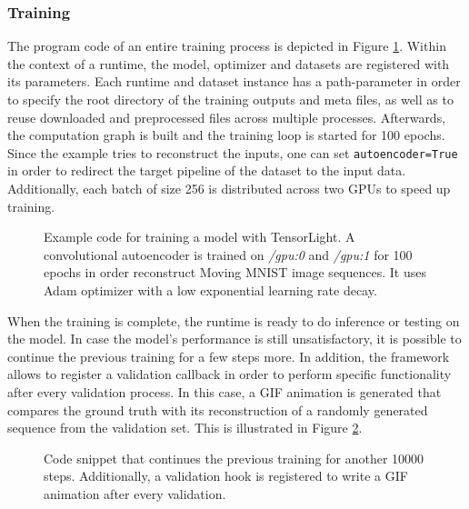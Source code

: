 \subsubsection*{Training}

The program code of an entire training process is depicted in Figure \ref{code:runtime_train}. Within the context of a runtime, the model, optimizer and datasets are registered with its parameters. Each runtime and dataset instance has a path-parameter in order to specify the root directory of the training outputs and meta files, as well as to reuse downloaded and preprocessed files across multiple processes. Afterwards, the computation graph is built and the training loop is started for \num{100} epochs. Since the example tries to reconstruct the inputs, one can set \texttt{autoencoder=True} in order to redirect the target pipeline of the dataset to the input data. Additionally, each batch of size \num{256} is distributed across two GPUs to speed up training.

\begin{figure}[htpb]
  
  \caption[Code: Training with TensorLight]{Example code for training a model with TensorLight. A convolutional autoencoder is trained on \textit{/gpu:0} and \textit{/gpu:1} for \num{100} epochs in order reconstruct Moving MNIST image sequences. It uses Adam optimizer with a low exponential learning rate decay.}
  \label{code:runtime_train}
\end{figure}

When the training is complete, the runtime is ready to do inference or testing on the model. In case the model's performance is still unsatisfactory, it is possible to continue the previous training for a few steps more. In addition, the framework allows to register a validation callback in order to perform specific functionality after every validation process. In this case, a GIF animation is generated that compares the ground truth with its reconstruction of a randomly generated sequence from the validation set. This is illustrated in Figure \ref{code:runtime_hook}.

\begin{figure}[htpb]
  
  \caption[Code: Continuing Training and Validation Hooks in TensorLight]{Code snippet that continues the previous training for another \num{10000} steps. Additionally, a validation hook is registered to write a GIF animation after every validation.}
  \label{code:runtime_hook}
\end{figure}


